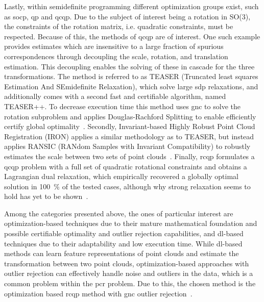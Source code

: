 Lastly, within semidefinite programming different optimization groups exist, such as \gls{socp}, \gls{qp} and \gls{qcqp}. Due to the subject of interest being a rotation in SO(\num{3}), the constraints of the rotation matrix, i.e. quadratic constraints, must be respected. Because of this, the methods of \gls{qcqp} are of interest. \medskip
One such example provides estimates which are insensitive to a large fraction of spurious correspondences through decoupling the scale, rotation, and translation estimation. This decoupling enables the solving of these in cascade for the three transformations. The method is referred to as TEASER (Truncated least squares Estimation And SEmidefinite Relaxation), which solve large \gls{sdp} relaxations, and additionally comes with a second fast and certifiable algorithm, named TEASER++. To decrease execution time this method uses \gls{gnc} to solve the rotation subproblem and applies Douglas-Rachford Splitting to enable efficiently certify global optimality~\cite{teaser:-fast-and-certifiable-point-cloud-registration}. Secondly, Invariant-based Highly Robust Point Cloud Registration (IRON) applies a similar methodology as to TEASER, but instead applies RANSIC (RANdom Samples with Invariant Compatibility) to robustly estimates the scale between two sets of point clouds~\cite{iron:-invariant-based-highly-robust-point-cloud-registration}. Finally, \gls{rcqp} formulates a \gls{qcqp} problem with a full set of quadratic rotational constraints and obtains a Lagrangian dual relaxation, which empirically recovered a globally optimal solution in \SI{100}{\percent} of the tested cases, although why strong relaxation seems to hold has yet to be shown~\cite{convex-global-3d-registration-with-lagrangian-duality}. \medskip

Among the categories presented above, the ones of particular interest are optimization-based techniques due to their mature mathematical foundation and possible certifiable optimality and outlier rejection capabilities, and \gls{dl}-based techniques due to their adaptability and low execution time. While \gls{dl}-based methods can learn feature representations of point clouds and estimate the transformation between two point clouds, optimization-based approaches with outlier rejection can effectively handle noise and outliers in the data, which is a common problem within the \gls{pcr} problem. Due to this, the chosen method is the optimization based \gls{rcqp} method with \gls{gnc} outlier rejection~\cite{graduated-non-convexity-for-robust-spatial-perception:-from-non-minimal-solvers-to-global-outlier-rejection}.



